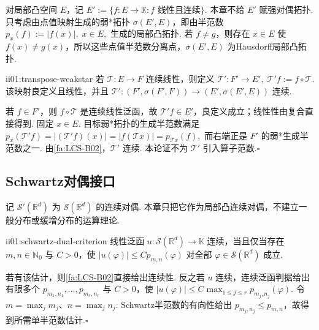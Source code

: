 对局部凸空间 \(\displaystyle E\)，记
\(\displaystyle E' := \{f:E\to\mathbb K:f\text{ 线性且连续}\}.\)
本章不给 \(\displaystyle E'\) 赋强对偶拓扑. 只考虑由点值映射生成的弱*拓扑 \(\displaystyle \sigma(E',E)\)，即由半范数
\(\displaystyle p_x(f):=|f(x)|,\; x\in E,\)
生成的局部凸拓扑. 若 \(\displaystyle f\neq g\)，则存在 \(\displaystyle x\in E\) 使 \(\displaystyle f(x)\neq g(x)\)，所以这些点值半范数分离点，\(\displaystyle \sigma(E',E)\) 为Hausdorff局部凸拓扑.

\begin{FAProposition}{ii01:transpose-weakstar}
若 \(\displaystyle \mathcal T:E\to F\) 连续线性，则定义
\(\displaystyle \mathcal T':F'\to E', \; \mathcal T'f:=f\circ\mathcal T.\)
该映射良定义且线性，并且
\(\displaystyle \mathcal T':(F',\sigma(F',F)) \to (E',\sigma(E',E))\)
连续.
\end{FAProposition}

\begin{FAProof}
若 \(\displaystyle f\in F'\)，则 \(\displaystyle f\circ\mathcal T\) 是连续线性泛函，故 \(\displaystyle \mathcal T'f\in E'\)，良定义成立；线性性由复合直接得到. 固定 \(\displaystyle x\in E\). 目标弱*拓扑的生成半范数满足
\(\displaystyle p_x(\mathcal T'f) = |(\mathcal T'f)(x)| = |f(\mathcal Tx)| = p_{\mathcal Tx}(f),\)
而右端正是 \(\displaystyle F'\) 的弱*生成半范数之一. 由\autoref{fa:LCS-B02}，\(\displaystyle \mathcal T'\) 连续. 本论证不为 \(\displaystyle \mathcal T'\) 引入算子范数.\hfill\(\square\)
\end{FAProof}

\subsection{Schwartz对偶接口}

记 \(\displaystyle \mathcal S'(\mathbb R^d)\) 为 \(\displaystyle \mathcal S(\mathbb R^d)\) 的连续对偶. 本章只把它作为局部凸连续对偶，不建立一般分布或缓增分布的运算理论.

\begin{FAProposition}[B][Schwartz对偶的连续性估计]{ii01:schwartz-dual-criterion}
线性泛函 \(\displaystyle u:\mathcal S(\mathbb R^d)\to\mathbb K\) 连续，当且仅当存在 \(\displaystyle m,n\in\mathbb N_0\) 与 \(\displaystyle C>0\)，使
\(\displaystyle |u(\varphi)| \leqslant C p_{m,n}(\varphi)\)
对全部 \(\displaystyle \varphi\in\mathcal S(\mathbb R^d)\) 成立.
\end{FAProposition}

\begin{FAProof}
若有该估计，则\autoref{fa:LCS-B02}直接给出连续性. 反之若 \(\displaystyle u\) 连续，连续泛函判据给出有限多个 \(\displaystyle p_{m_1,n_1},\dots,p_{m_r,n_r}\) 与 \(\displaystyle C>0\)，使
\(\displaystyle |u(\varphi)| \leqslant C\max_{1\leqslant j\leqslant r}p_{m_j,n_j}(\varphi).\)
令 \(\displaystyle m=\max_jm_j\)、\(\displaystyle n=\max_jn_j\). Schwartz半范数的有向性给出 \(\displaystyle p_{m_j,n_j}\leqslant p_{m,n}\)，故得到所需单半范数估计.\hfill\(\square\)
\end{FAProof}

